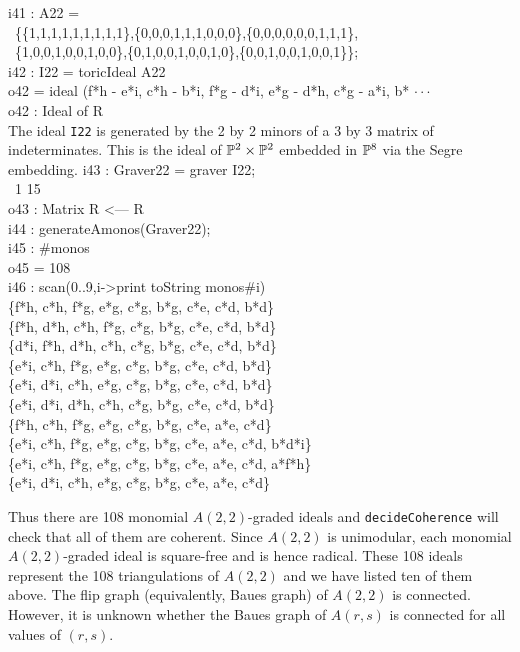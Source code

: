 \beginOutput
i41 : A22 =\\
\        \{\{1,1,1,1,1,1,1,1,1\},\{0,0,0,1,1,1,0,0,0\},\{0,0,0,0,0,0,1,1,1\},\\
\        \{1,0,0,1,0,0,1,0,0\},\{0,1,0,0,1,0,0,1,0\},\{0,0,1,0,0,1,0,0,1\}\}; \\
\endOutput
\beginOutput
i42 : I22 = toricIdeal A22\\
\emptyLine
o42 = ideal (f*h - e*i, c*h - b*i, f*g - d*i, e*g - d*h, c*g - a*i, b* $\cdot\cdot\cdot$\\
\emptyLine
o42 : Ideal of R\\
\endOutput
The ideal {\tt I22} is generated by the 2 by 2 minors of a 3 by 3
matrix of indeterminates.  This is the ideal of $\P^2 \times \P^2$
embedded in $\P^8$ via the Segre embedding.
\beginOutput
i43 : Graver22 = graver I22;\\
\emptyLine
\              1       15\\
o43 : Matrix R  <--- R\\
\endOutput
\beginOutput
i44 : generateAmonos(Graver22);\\
\endOutput
\beginOutput
i45 : #monos\\
\emptyLine
o45 = 108\\
\endOutput
\beginOutput
i46 : scan(0..9,i->print toString monos#i) \\
\{f*h, c*h, f*g, e*g, c*g, b*g, c*e, c*d, b*d\}\\
\{f*h, d*h, c*h, f*g, c*g, b*g, c*e, c*d, b*d\}\\
\{d*i, f*h, d*h, c*h, c*g, b*g, c*e, c*d, b*d\}\\
\{e*i, c*h, f*g, e*g, c*g, b*g, c*e, c*d, b*d\}\\
\{e*i, d*i, c*h, e*g, c*g, b*g, c*e, c*d, b*d\}\\
\{e*i, d*i, d*h, c*h, c*g, b*g, c*e, c*d, b*d\}\\
\{f*h, c*h, f*g, e*g, c*g, b*g, c*e, a*e, c*d\}\\
\{e*i, c*h, f*g, e*g, c*g, b*g, c*e, a*e, c*d, b*d*i\}\\
\{e*i, c*h, f*g, e*g, c*g, b*g, c*e, a*e, c*d, a*f*h\}\\
\{e*i, d*i, c*h, e*g, c*g, b*g, c*e, a*e, c*d\}\\
\endOutput

Thus there are 108 monomial $A(2,2)$-graded ideals and 
{\tt decideCoherence} will check that all of them 
are coherent. Since $A(2,2)$ is unimodular, each monomial 
$A(2,2)$-graded ideal is square-free and is hence 
radical. These 108 ideals represent the 108 triangulations of 
$A(2,2)$ and we have listed ten of them above.
The flip graph (equivalently, Baues graph) of $A(2,2)$ is connected.
However, it is unknown whether the Baues graph of $A(r,s)$ is 
connected for all values of $(r,s)$.

